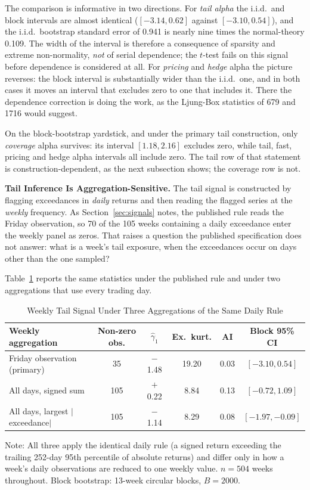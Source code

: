 \documentclass[11pt]{article}
\begin{document}
The comparison is informative in two directions. For \emph{tail alpha} the i.i.d.\ and block intervals are almost identical ($[-3.14, 0.62]$ against $[-3.10, 0.54]$), and the i.i.d.\ bootstrap standard error of 0.941 is nearly nine times the normal-theory 0.109. The width of the interval is therefore a consequence of sparsity and extreme non-normality, \emph{not} of serial dependence; the $t$-test fails on this signal before dependence is considered at all. For \emph{pricing} and \emph{hedge} alpha the picture reverses: the block interval is substantially wider than the i.i.d.\ one, and in both cases it moves an interval that excludes zero to one that includes it. There the dependence correction is doing the work, as the Ljung-Box statistics of 679 and 1716 would suggest.

On the block-bootstrap yardstick, and under the primary tail construction, only \emph{coverage} alpha survives: its interval $[1.18, 2.16]$ excludes zero, while tail, fast, pricing and hedge alpha intervals all include zero. The tail row of that statement is construction-dependent, as the next subsection shows; the coverage row is not.

\textbf{Tail Inference Is Aggregation-Sensitive.} The tail signal is constructed by flagging exceedances in \emph{daily} returns and then reading the flagged series at the \emph{weekly} frequency. As Section~\ref{sec:signals} notes, the published rule reads the Friday observation, so 70 of the 105 weeks containing a daily exceedance enter the weekly panel as zeros. That raises a question the published specification does not answer: what is a week's tail exposure, when the exceedances occur on days other than the one sampled?

Table~\ref{tab:tailagg} reports the same statistics under the published rule and under two aggregations that use every trading day.

\begin{table}[H]
\centering
\caption{Weekly Tail Signal Under Three Aggregations of the Same Daily Rule}
\label{tab:tailagg}
\small
\begin{tabular}{@{}lccccc@{}}
\toprule
Weekly aggregation & Non-zero obs. & $\hat{\gamma}_1$ & Ex.\ kurt. & AI & Block 95\% CI \\
\midrule
Friday observation (primary) & 35 & $-$1.48 & 19.20 & 0.03 & $[-3.10, 0.54]$ \\
All days, signed sum & 105 & $+$0.22 & 8.84 & 0.13 & $[-0.72, 1.09]$ \\
All days, largest $|$exceedance$|$ & 105 & $-$1.14 & 8.29 & 0.08 & $[-1.97, -0.09]$ \\
\bottomrule
\end{tabular}
\par\vspace{0.3em}
\parbox{\linewidth}{\footnotesize Note: All three apply the identical daily rule (a signed return exceeding the trailing 252-day 95th percentile of absolute returns) and differ only in how a week's daily observations are reduced to one weekly value. $n = 504$ weeks throughout. Block bootstrap: 13-week circular blocks, $B = 2000$.}
\end{table}
\end{document}
